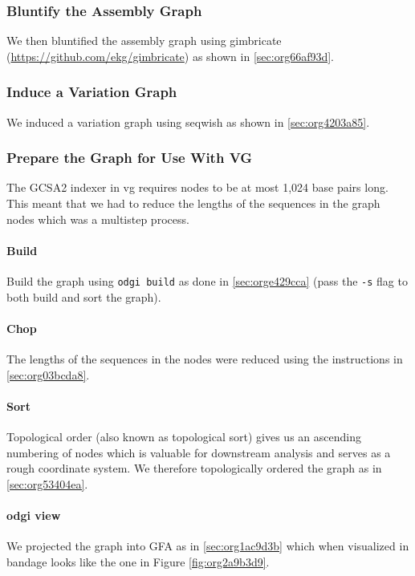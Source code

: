 \documentclass[10pt, a4paper]{article}
\begin{document}
\subsubsection{Bluntify the Assembly Graph}
\label{sec:org0c3d345}
We then bluntified the assembly graph 
using gimbricate (\url{https://github.com/ekg/gimbricate}) as shown in
\ref{sec:org66af93d}.

\subsubsection{Induce a Variation Graph}
\label{sec:org703a1f4}
We induced a variation graph using seqwish as shown in \ref{sec:org4203a85}.

\subsubsection{Prepare the Graph for Use With VG}
\label{sec:orga3de272}
The GCSA2  indexer in vg requires nodes to be at
most 1,024 base pairs long.
This meant that we had to reduce the lengths of the sequences in the graph nodes
which was a multistep process.

\paragraph{Build}
\label{sec:orgbc51682}
Build the graph using \texttt{odgi build} as done in \ref{sec:orge429cca}
(pass the \texttt{-s} flag to both build and sort the graph).

\paragraph{Chop}
\label{sec:org5a461ac}
The lengths of the sequences in the nodes were reduced using the instructions in
\ref{sec:org03bcda8}.

\paragraph{Sort}
\label{sec:orgda60103}
Topological order (also known as topological sort) gives us an ascending numbering of nodes which is 
valuable for downstream analysis and serves as a rough coordinate system.
We therefore topologically ordered the graph as in \ref{sec:org53404ea}.

\paragraph{odgi view}
\label{sec:org29fa72a}
We projected the graph into GFA as in \ref{sec:org1ac9d3b} which when visualized in
bandage looks like the one in Figure \ref{fig:org2a9b3d9}.
\end{document}

